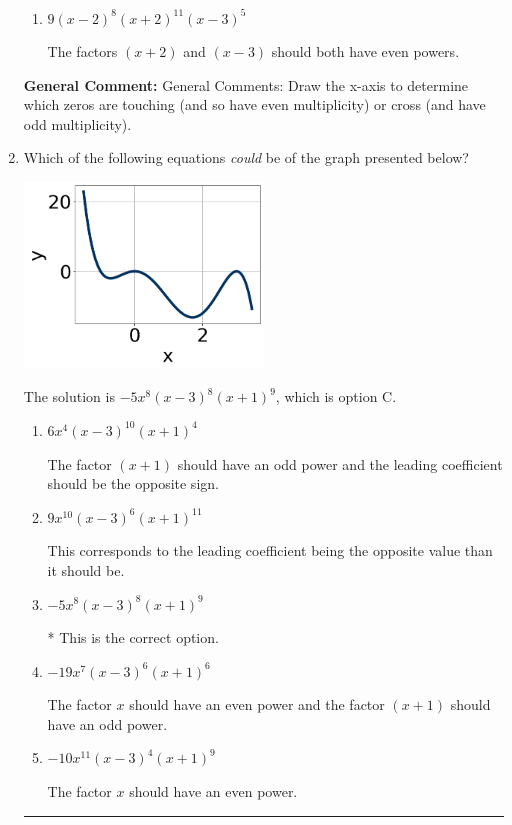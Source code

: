 \documentclass{extbook}[14pt]
\newcommand{\litem}[1]{\item #1

\rule{\textwidth}{0.4pt}}
\begin{document}
\begin{enumerate}
{\begin{enumerate}[label=\Alph*.]
The factor $(x - 3)$ should have an even power.
\item \( 9(x - 2)^{8} (x + 2)^{11} (x - 3)^{5} \)

The factors $(x + 2)$ and $(x - 3)$ should both have even powers.
\end{enumerate}

\textbf{General Comment:} General Comments: Draw the x-axis to determine which zeros are touching (and so have even multiplicity) or cross (and have odd multiplicity).
}
\litem{
Which of the following equations \textit{could} be of the graph presented below?

\begin{center}
    \includegraphics[width=0.5\textwidth]{../Figures/polyGraphToFunctionC.png}
\end{center}



The solution is \( -5x^{8} (x - 3)^{8} (x + 1)^{9} \), which is option C.\begin{enumerate}[label=\Alph*.]
\item \( 6x^{4} (x - 3)^{10} (x + 1)^{4} \)

The factor $(x + 1)$ should have an odd power and the leading coefficient should be the opposite sign.
\item \( 9x^{10} (x - 3)^{6} (x + 1)^{11} \)

This corresponds to the leading coefficient being the opposite value than it should be.
\item \( -5x^{8} (x - 3)^{8} (x + 1)^{9} \)

* This is the correct option.
\item \( -19x^{7} (x - 3)^{6} (x + 1)^{6} \)

The factor $x$ should have an even power and the factor $(x + 1)$ should have an odd power.
\item \( -10x^{11} (x - 3)^{4} (x + 1)^{9} \)

The factor $x$ should have an even power.
\end{enumerate}

}
\end{enumerate}
\end{document}
